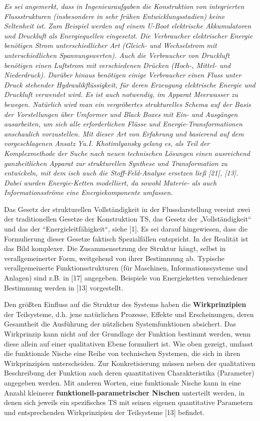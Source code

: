 \documentclass[11pt,a4paper]{article}
\begin{document}
\emph{Es sei angemerkt, dass in Ingenieuraufgaben die Konstruktion von
  integrierten Flussstrukturen (insbesondere in sehr frühen
  Entwicklungsstadien) keine Seltenheit ist. Zum Beispiel werden auf einem
  U-Boot elektrische Akkumulatoren und Druckluft als Energiequellen
  eingesetzt.  Die Verbraucher elektrischer Energie benötigen Strom
  unterschiedlicher Art (Gleich- und Wechselstrom mit unterschiedlichen
  Spannungswerten).  Auch die Verbraucher von Druckluft benötigen einen
  Luftstrom mit verschiedenen Drücken (Hoch-, Mittel- und Niederdruck).
  Darüber hinaus benötigen einige Verbraucher einen Fluss unter Druck
  stehender Hydraulikflüssigkeit, für deren Erzeugung elektrische Energie und
  Druckluft verwendet wird. Es ist auch notwendig, im Apparat Meerwasser zu
  bewegen.  Natürlich wird man ein vergröbertes strukturelles Schema auf der
  Basis der Vorstellungen über Umformer und Black Boxes mit Ein- und Ausgängen
  ausarbeiten, um sich alle erforderlichen Flüsse und Energie-Transformationen
  anschaulich vorzustellen. Mit dieser Art von Erfahrung und basierend auf dem
  vorgeschlagenen Ansatz Yu.I. Khotimlyansky gelang es, als Teil der
  Komplexmethode der Suche nach neuen technischen Lösungen einen ausreichend
  ganzheitlichen Apparat zur strukturellen Synthese und Transformation zu
  entwickeln, mit dem isch auch die Stoff-Feld-Analyse ersetzen ließ [21],
  [13].  Dabei wurden Energie-Ketten modelliert, da sowohl Materie- als auch
  Informationsströme eine Energiekomponente umfassen.}

Das Gesetz der strukturellen Vollständigkeit in der Flussdarstellung vereint
zwei der traditionellen Gesetze der Konstruktion TS, das Gesetz der
„Vollständigkeit“ und das der “Energieleitfähigkeit“, siehe [1]. Es sei darauf
hingewiesen, dass die Formulierung dieser Gesetze faktisch Spezialfällen
entspricht. In der Realität ist das Bild komplexer. Die Zusammensetzung der
Struktur hängt, selbst in verallgemeinerter Form, weitgehend von ihrer
Bestimmung ab. Typische verallgemeinerte Funktionsstrukturen (für Maschinen,
Informationssysteme und Anlagen) sind z.B. in [17] angegeben. Beispiele von
Energieketten verschiedener Bestimmung werden in [13] vorgestellt.

Den größten Einfluss auf die Struktur des Systems haben die
\textbf{Wirkprinzipien} der Teilsysteme, d.h.  jene natürlichen Prozesse,
Effekte und Erscheinungen, deren Gesamtheit die Ausführung der nützlichen
Systemfunktionen absichert. Das Wirkprinzip kann nicht auf der Grundlage der
Funktion bestimmt werden, wenn diese allein auf einer qualitativen Ebene
formuliert ist. Wie oben gezeigt, umfasst die funktionale Nische eine Reihe
von technischen Systemen, die sich in ihren Wirkprinzipien unterscheiden.  Zur
Konkretisierung müssen neben der qualitativen Beschreibung der Funktion auch
deren quantitativen Charakteristika (Parameter) angegeben werden. Mit anderen
Worten, eine funktionale Nische kann in eine Anzahl kleinerer
\textbf{funktionell-parametrischer Nischen} unterteilt werden, in denen sich
jeweils ein spezifisches TS mit seinen eigenen quantitative Parametern und
entsprechenden Wirkprinzipien der Teilsysteme [13] befindet.
\end{document}
